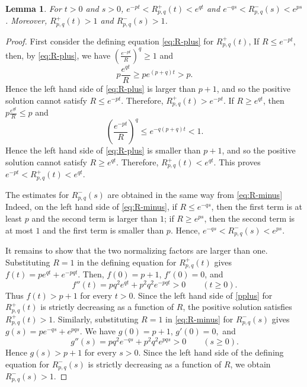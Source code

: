 \documentclass[twoside,12pt]{article}
\numberwithin{equation}{section}
\newtheorem{lemma}[theorem]{Lemma}
\begin{document}
\begin{lemma}\label{fact:R-basic}
For $t>0$ and $s>0$,
$e^{-pt}<R^+_{p,q}(t)<e^{qt}$ and
$e^{-qs}<R^-_{p,q}(s)<e^{ps}$.
Moreover,
$R^+_{p,q}(t)>1$ and
        $R^-_{p,q}(s)>1$.
\end{lemma}
\begin{proof}
First consider the defining equation \eqref{eq:R-plus} for $R^+_{p,q}(t)$,
If $R\le e^{-pt}$, then, by \eqref{eq:R-plus}, we have
$\left(\frac{e^{-pt}}{R}\right)^q\ge1$
and
\[
        p\frac{e^{qt}}{R}
        \ge
        p e^{(p+q)t}
        >p.
\]
Hence the left hand side of \eqref{eq:R-plus} is larger than $p+1$, and so the positive solution cannot satisfy $R\le e^{-pt}$.  Therefore, $R^+_{p,q}(t)>e^{-pt}$.
If $R\ge e^{qt}$, then
$p\frac{e^{qt}}{R}\le p$
and
\[
        \left(\frac{e^{-pt}}{R}\right)^q
        \le
        e^{-q(p+q)t}
        <1.
\]
Hence the left hand side of \eqref{eq:R-plus} is smaller than $p+1$, and so the positive solution cannot satisfy $R\ge e^{qt}$. Therefore,
$R^+_{p,q}(t)<e^{qt}$.
This proves
$e^{-pt}<R^+_{p,q}(t)<e^{qt}$.

The estimates for $R^-_{p,q}(s)$ are obtained in the same way from \eqref{eq:R-minus}
Indeed, on the left hand side of \eqref{eq:R-minus}, if $R\le e^{-qs}$, then the first term is at least $p$ and the second term is larger than $1$; if $R\ge e^{ps}$, then the second term is at most $1$ and the first term is smaller than $p$.  Hence, $e^{-qs}<R^-_{p,q}(s)<e^{ps}$.

It remains to show that the two normalizing factors are larger than one.  Substituting $R=1$ in the defining equation for $R^+_{p,q}(t)$ gives
$f(t)=p e^{qt}+e^{-pqt}$.
Then, $f(0)=p+1$, $f'(0)=0$,
and
\[
        f''(t)=p q^2 e^{qt}+p^2q^2 e^{-pqt}>0
        \qquad(t\ge0).
\]
Thus $f(t)>p+1$ for every $t>0$. Since the left hand side of \eqref{pplus} for $R^+_{p,q}(t)$ is strictly decreasing as a function of $R$, the positive solution satisfies
$R^+_{p,q}(t)>1$.
Similarly, substituting $R=1$ in \eqref{eq:R-minus} for $R^-_{p,q}(s)$ gives
$g(s)=p e^{-qs}+e^{pqs}$.
We have $g(0)=p+1$,
        $g'(0)=0,$
and
\[
        g''(s)=p q^2 e^{-qs}+p^2q^2 e^{pqs}>0
        \qquad(s\ge0).
\]
Hence $g(s)>p+1$ for every $s>0$.  Since the left hand side of the defining equation for $R^-_{p,q}(s)$ is strictly decreasing as a function of $R$, we obtain
$R^-_{p,q}(s)>1$.
\end{proof}
\end{document}
